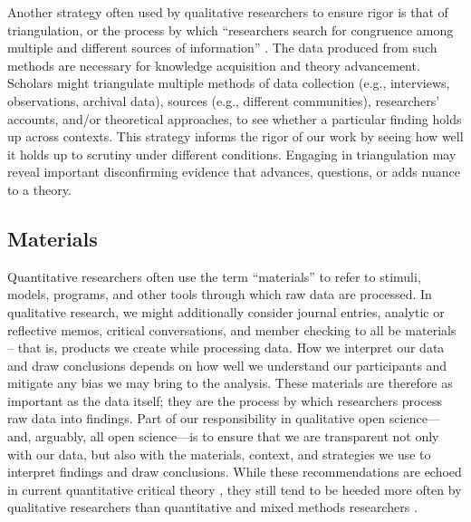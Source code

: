 \documentclass[authordate, meta]{jote-new-article}
\begin{document}
Another strategy often used by qualitative researchers to ensure rigor is that of triangulation, or the process by which “researchers search for congruence among multiple and different sources of information” \parencites[page 126]{Creswell2000}. The data produced from such methods are necessary for knowledge acquisition and theory advancement. Scholars might triangulate multiple methods of data collection (e.g., interviews, observations, archival data), sources (e.g., different communities), researchers’ accounts, and/or theoretical approaches, to see whether a particular finding holds up across contexts. This strategy informs the rigor of our work by seeing how well it holds up to scrutiny under different conditions. Engaging in triangulation may reveal important disconfirming evidence that advances, questions, or adds nuance to a theory.







\subsection{Materials }



Quantitative researchers often use the term “materials” to refer to stimuli, models, programs, and other tools through which raw data are processed. In qualitative research, we might additionally consider journal entries, analytic or reflective memos, critical conversations, and member checking to all be materials – that is, products we create while processing data. How we interpret our data and draw conclusions depends on how well we understand our participants and mitigate any bias we may bring to the analysis. These materials are therefore as important as the data itself; they are the process by which researchers process raw data into findings. Part of our responsibility in qualitative open science—and, arguably, all open science—is to ensure that we are transparent not only with our data, but also with the materials, context, and strategies we use to interpret findings and draw conclusions. While these recommendations are echoed in current quantitative critical theory \parencites[QuantCrit; e.g.,][]{Gillborn2018}, they still tend to be heeded more often by qualitative researchers than quantitative and mixed methods researchers \parencites{Hope2019}.
\end{document}
